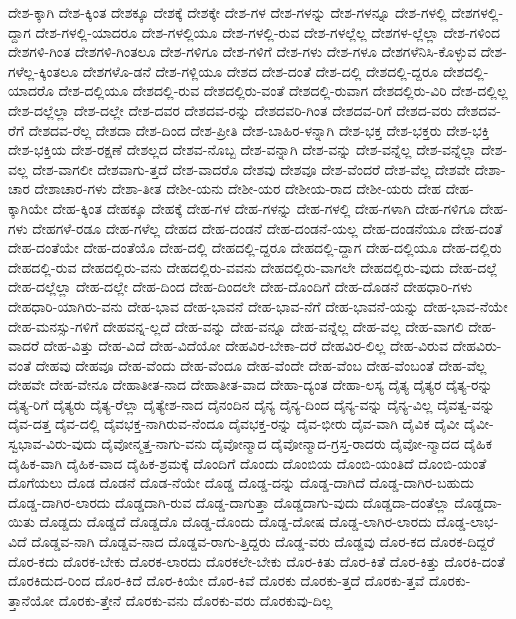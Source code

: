 {ದೇಶ-ಕ್ಕಾಗಿ
ದೇಶ-ಕ್ಕಿಂತ
ದೇಶಕ್ಕೂ
ದೇಶಕ್ಕೆ
ದೇಶಕ್ಕೇ
ದೇಶ-ಗಳ
ದೇಶ-ಗಳನ್ನು
ದೇಶ-ಗಳನ್ನೂ
ದೇಶ-ಗಳಲ್ಲಿ
ದೇಶಗಳಲ್ಲಿ-ದ್ದಾಗ
ದೇಶ-ಗಳಲ್ಲಿ-ಯಾದರೂ
ದೇಶ-ಗಳಲ್ಲಿಯೂ
ದೇಶ-ಗಳಲ್ಲಿ-ರುವ
ದೇಶ-ಗಳಲ್ಲೆಲ್ಲ
ದೇಶಗಳ-ಲ್ಲೆಲ್ಲಾ
ದೇಶ-ಗಳಿಂದ
ದೇಶಗಳಿ-ಗಿಂತ
ದೇಶಗಳಿ-ಗಿಂತಲೂ
ದೇಶ-ಗಳಿಗೂ
ದೇಶ-ಗಳಿಗೆ
ದೇಶ-ಗಳು
ದೇಶ-ಗಳೂ
ದೇಶಗಳೆನಿಸಿ-ಕೊಳ್ಳುವ
ದೇಶ-ಗಳೆಲ್ಲ-ಕ್ಕಿಂತಲೂ
ದೇಶಗಳೊ-ಡನೆ
ದೇಶ-ಗಳ್ಲಿಯೂ
ದೇಶದ
ದೇಶ-ದಂತೆ
ದೇಶ-ದಲ್ಲಿ
ದೇಶದಲ್ಲಿ-ದ್ದರೂ
ದೇಶದಲ್ಲಿ-ಯಾದರೊ
ದೇಶ-ದಲ್ಲಿಯೂ
ದೇಶದಲ್ಲಿ-ರುವ
ದೇಶದಲ್ಲಿರು-ವಂತೆ
ದೇಶದಲ್ಲಿ-ರುವಾಗ
ದೇಶದಲ್ಲಿರು-ವಿರಿ
ದೇಶ-ದಲ್ಲಿಲ್ಲ
ದೇಶ-ದಲ್ಲೆಲ್ಲಾ
ದೇಶ-ದಲ್ಲೇ
ದೇಶ-ದವರ
ದೇಶದವ-ರನ್ನು
ದೇಶದವರಿ-ಗಿಂತ
ದೇಶದವ-ರಿಗೆ
ದೇಶದ-ವರು
ದೇಶದವ-ರೆಗೆ
ದೇಶದವ-ರೆಲ್ಲ
ದೇಶದಾ
ದೇಶ-ದಿಂದ
ದೇಶ-ಪ್ರೀತಿ
ದೇಶ-ಬಾಹಿರ-ಳನ್ನಾಗಿ
ದೇಶ-ಭಕ್ತ
ದೇಶ-ಭಕ್ತರು
ದೇಶ-ಭಕ್ತಿ
ದೇಶ-ಭಕ್ತಿಯ
ದೇಶ-ರಕ್ಷಣೆ
ದೇಶಲ್ಲದ
ದೇಶವ-ನೊಬ್ಬ
ದೇಶ-ವನ್ನಾಗಿ
ದೇಶ-ವನ್ನು
ದೇಶ-ವನ್ನೆಲ್ಲ
ದೇಶ-ವನ್ನೆಲ್ಲಾ
ದೇಶ-ವಲ್ಲ
ದೇಶ-ವಾಗಲೀ
ದೇಶವಾಗು-ತ್ತದೆ
ದೇಶ-ವಾದರೊ
ದೇಶವು
ದೇಶವೂ
ದೇಶ-ವೆಂದರೆ
ದೇಶ-ವೆಲ್ಲ
ದೇಶವೇ
ದೇಶಾ-ಚಾರ
ದೇಶಾಚಾರ-ಗಳು
ದೇಶಾ-ತೀತ
ದೇಶೀ-ಯನು
ದೇಶೀ-ಯರ
ದೇಶೀಯ-ರಾದ
ದೇಶೀ-ಯರು
ದೇಹ
ದೇಹ-ಕ್ಕಾಗಿಯೇ
ದೇಹ-ಕ್ಕಿಂತ
ದೇಹಕ್ಕೂ
ದೇಹಕ್ಕೆ
ದೇಹ-ಗಳ
ದೇಹ-ಗಳನ್ನು
ದೇಹ-ಗಳಲ್ಲಿ
ದೇಹ-ಗಳಾಗಿ
ದೇಹ-ಗಳಿಗೂ
ದೇಹ-ಗಳು
ದೇಹಗಳೆ-ರಡೂ
ದೇಹ-ಗಳೆಲ್ಲ
ದೇಹದ
ದೇಹ-ದಂಡನೆ
ದೇಹ-ದಂಡನೆ-ಯಲ್ಲ
ದೇಹ-ದಂಡನೆಯೂ
ದೇಹ-ದಂತೆ
ದೇಹ-ದಂತೆಯೇ
ದೇಹ-ದಂತೆಯೊ
ದೇಹ-ದಲ್ಲಿ
ದೇಹದಲ್ಲಿ-ದ್ದರೂ
ದೇಹದಲ್ಲಿ-ದ್ದಾಗ
ದೇಹ-ದಲ್ಲಿಯೂ
ದೇಹ-ದಲ್ಲಿರು
ದೇಹದಲ್ಲಿ-ರುವ
ದೇಹದಲ್ಲಿರು-ವನು
ದೇಹದಲ್ಲಿರು-ವವನು
ದೇಹದಲ್ಲಿರು-ವಾಗಲೇ
ದೇಹದಲ್ಲಿರು-ವುದು
ದೇಹ-ದಲ್ಲೆ
ದೇಹ-ದಲ್ಲೆಲ್ಲಾ
ದೇಹ-ದಲ್ಲೇ
ದೇಹ-ದಿಂದ
ದೇಹ-ದಿಂದಲೇ
ದೇಹ-ದೊಂದಿಗೆ
ದೇಹ-ದೊಡನೆ
ದೇಹಧಾರಿ-ಗಳು
ದೇಹಧಾರಿ-ಯಾಗಿರು-ವನು
ದೇಹ-ಭಾವ
ದೇಹ-ಭಾವನೆ
ದೇಹ-ಭಾವ-ನೆಗೆ
ದೇಹ-ಭಾವನೆ-ಯನ್ನು
ದೇಹ-ಭಾವ-ನೆಯೇ
ದೇಹ-ಮನಸ್ಸು-ಗಳಿಗೆ
ದೇಹವನ್ನ-ಲ್ಲದೆ
ದೇಹ-ವನ್ನು
ದೇಹ-ವನ್ನೂ
ದೇಹ-ವನ್ನೆಲ್ಲ
ದೇಹ-ವಲ್ಲ
ದೇಹ-ವಾಗಲಿ
ದೇಹ-ವಾದರೆ
ದೇಹ-ವಿತ್ತು
ದೇಹ-ವಿದೆ
ದೇಹ-ವಿದೆಯೋ
ದೇಹವಿರ-ಬೇಕಾ-ದರೆ
ದೇಹವಿರ-ಲಿಲ್ಲ
ದೇಹ-ವಿರುವ
ದೇಹವಿರು-ವಂತೆ
ದೇಹವು
ದೇಹವೂ
ದೇಹ-ವೆಂದು
ದೇಹ-ವೆಂದೂ
ದೇಹ-ವೆಂದೇ
ದೇಹ-ವೆಂಬ
ದೇಹ-ವೆಂಬಂತೆ
ದೇಹ-ವೆಲ್ಲ
ದೇಹವೇ
ದೇಹ-ವೇನೂ
ದೇಹಾತೀತ-ನಾದ
ದೇಹಾತೀತ-ವಾದ
ದೇಹಾ-ದ್ಯಂತ
ದೇಹಾ-ಲಸ್ಯ
ದೈತ್ಯ
ದೈತ್ಯರ
ದೈತ್ಯ-ರನ್ನು
ದೈತ್ಯ-ರಿಗೆ
ದೈತ್ಯರು
ದೈತ್ಯ-ರೆಲ್ಲಾ
ದೈತ್ಯೇಶ-ನಾದ
ದೈನಂದಿನ
ದೈನ್ಯ
ದೈನ್ಯ-ದಿಂದ
ದೈನ್ಯ-ವನ್ನು
ದೈನ್ಯ-ವಿಲ್ಲ
ದೈವತ್ವ-ವನ್ನು
ದೈವ-ದತ್ತ
ದೈವ-ದಲ್ಲಿ
ದೈವಭಕ್ತ-ನಾಗಿರುವ-ನೆಂದೂ
ದೈವಭಕ್ತ-ರನ್ನು
ದೈವ-ಭೀರು
ದೈವ-ವಾಗಿ
ದೈವಿಕ
ದೈವೀ
ದೈವೀ-ಸ್ವಭಾವ-ವಿರು-ವುದು
ದೈವೋನ್ಮತ್ತ-ನಾಗು-ವನು
ದೈವೋನ್ಮಾದ
ದೈವೋನ್ಮಾದ-ಗ್ರಸ್ತ-ರಾದರು
ದೈವೋ-ನ್ಮಾದದ
ದೈಹಿಕ
ದೈಹಿಕ-ವಾಗಿ
ದೈಹಿಕ-ವಾದ
ದೈಹಿಕ-ಶ್ರಮಕ್ಕೆ
ದೊಂದಿಗೆ
ದೊಂದು
ದೊಂಬಿಯ
ದೊಂಬಿ-ಯಂತಿದೆ
ದೊಂಬಿ-ಯಂತೆ
ದೊಗೆಯಲು
ದೊಡ
ದೊಡನೆ
ದೊಡ-ನೆಯೇ
ದೊಡ್ಡ
ದೊಡ್ಡ-ದನ್ನು
ದೊಡ್ಡ-ದಾಗಿದೆ
ದೊಡ್ಡ-ದಾಗಿರ-ಬಹುದು
ದೊಡ್ಡ-ದಾಗಿರ-ಲಾರದು
ದೊಡ್ಡದಾಗಿ-ರುವ
ದೊಡ್ಡ-ದಾಗುತ್ತಾ
ದೊಡ್ಡದಾಗು-ವುದು
ದೊಡ್ಡದಾ-ದಂತೆಲ್ಲಾ
ದೊಡ್ಡದಾ-ಯಿತು
ದೊಡ್ಡದು
ದೊಡ್ಡದೆ
ದೊಡ್ಡದೊ
ದೊಡ್ಡ-ದೊಂದು
ದೊಡ್ಡ-ದೋಷ
ದೊಡ್ಡ-ಲಾಗಿರ-ಲಾರದು
ದೊಡ್ಡ-ಲಾಭ-ವಿದೆ
ದೊಡ್ಡವ-ನಾಗಿ
ದೊಡ್ಡವ-ನಾದ
ದೊಡ್ಡವ-ರಾಗು-ತ್ತಿದ್ದರು
ದೊಡ್ಡ-ವರು
ದೊಡ್ಡವು
ದೊರ-ಕದ
ದೊರಕ-ದಿದ್ದರೆ
ದೊರ-ಕದು
ದೊರಕ-ಬೇಕು
ದೊರಕ-ಲಾರದು
ದೊರಕಲೇ-ಬೇಕು
ದೊರ-ಕಿತು
ದೊರ-ಕಿತೆ
ದೊರ-ಕಿತ್ತು
ದೊರಕಿ-ದಂತೆ
ದೊರಕಿದುದ-ರಿಂದ
ದೊರ-ಕಿದೆ
ದೊರ-ಕಿಯೇ
ದೊರ-ಕಿವೆ
ದೊರಕು
ದೊರಕು-ತ್ತದೆ
ದೊರಕು-ತ್ತವೆ
ದೊರಕು-ತ್ತಾನೆಯೋ
ದೊರಕು-ತ್ತೇನೆ
ದೊರಕು-ವನು
ದೊರಕು-ವರು
ದೊರಕುವು-ದಿಲ್ಲ
}
